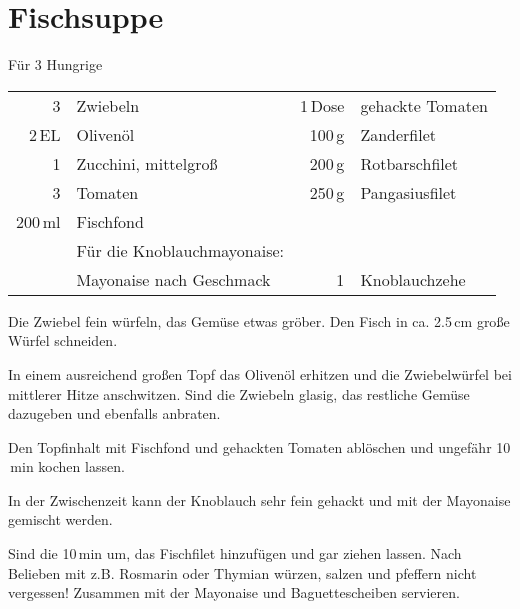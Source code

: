 \section*{Fischsuppe}
\begin{centering}
F\"{u}r 3 Hungrige
\end{centering}
\begin{table}[H]
\centering
\begin{tabular*}{1\textwidth}{rlrl}
3 & Zwiebeln & 1\,Dose & gehackte Tomaten\\
2\,EL & Olivenöl &100\,g & Zanderfilet\\
1 & Zucchini, mittelgroß & 200\,g & Rotbarschfilet\\
3 & Tomaten & 250\,g & Pangasiusfilet\\
200\,ml & Fischfond && \\
&Für die Knoblauchmayonaise:&&\\
& Mayonaise nach Geschmack & 1 & Knoblauchzehe\\
\end{tabular*}
\end{table}
\begin{Notes}
\item Die Zwiebel fein w\"{u}rfeln, das Gem\"{u}se etwas gr\"{o}ber. Den Fisch
  in ca. 2.5\,cm gro{\ss}e W\"{u}rfel schneiden. 
\item In einem ausreichend gro{\ss}en Topf das Oliven\"{o}l erhitzen und die
  Zwiebelw\"{u}rfel bei mittlerer Hitze anschwitzen. Sind die Zwiebeln glasig,
  das restliche Gem\"{u}se dazugeben und ebenfalls anbraten. 
\item Den Topfinhalt mit Fischfond und gehackten Tomaten abl\"{o}schen und
  ungef\"{a}hr 10 \,min kochen lassen. 
\item In der Zwischenzeit kann der Knoblauch sehr fein gehackt und mit der
  Mayonaise gemischt werden. 
\item Sind die 10\,min um, das Fischfilet hinzuf\"{u}gen und gar ziehen lassen.
  Nach Belieben mit z.B. Rosmarin oder Thymian w\"{u}rzen, salzen und pfeffern
  nicht vergessen!
  Zusammen mit der Mayonaise und Baguettescheiben servieren.
\end{Notes}
